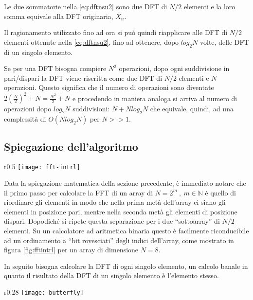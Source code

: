 Le due sommatorie nella \ref{eq:dftnsu2} sono due DFT di ${N/2}$ elementi e la loro somma equivale alla DFT originaria, $X_n$.

Il ragionamento utilizzato fino ad ora si può quindi riapplicare alle DFT di $N/2$ elementi ottenute nella \ref{eq:dftnsu2}, fino ad ottenere, dopo $log_2 N$ volte, delle DFT di un singolo elemento.

Se per una DFT bisogna compiere $N^2$ operazioni, dopo ogni suddivisione in pari/dispari la DFT viene riscritta come due DFT di $N/2$ elementi e $N$ operazioni. Questo significa che il numero di operazioni sono diventate $2(\frac{N}{2})^2 + N = \frac{N^2}{2}+N$ e procedendo in maniera analoga si arriva al numero di operazioni dopo $log_2 N$ suddivisioni: $N + Nlog_2 N$ che equivale, quindi, ad una complessità di $O(Nlog_2 N)$ per $N >> 1$.

\subsection{Spiegazione dell'algoritmo}

\begin{wrapfigure}{r}{0.5\textwidth}
    \centering
    \texttt{[image: fft-intrl]}
    \caption{Scomposizione interlacciata per il calcolo della FFT di un array di 8 elementi.}
    \label{fig:fftintrl}
\end{wrapfigure}

Data la spiegazione matematica della sezione precedente, è immediato notare che il primo passo per calcolare la FFT di un array di $N=2^m\ ,\ m\in\mathbb{N}$ è quello di riordinare gli elementi in modo che nella prima metà dell'array ci siano gli elementi in posizione pari, mentre nella seconda metà gli elementi di posizione dispari. Dopodiché si ripete questa separazione per i due ``sottoarray'' di $N/2$ elementi. Su un calcolatore ad aritmetica binaria questo è facilmente riconducibile ad un ordinamento a ``bit rovesciati'' degli indici dell'array, come mostrato in figura \ref{fig:fftintrl} per un array di dimensione $N=8$.

In seguito bisogna calcolare la DFT di ogni singolo elemento, un calcolo banale in quanto il risultato della DFT di un singolo elemento è l'elemento stesso.

\begin{wrapfigure}{r}{0.28\textwidth}
    \centering
    \texttt{[image: butterfly]}
    \caption{La ``farfalla'', operazione fondamentale per la FFT.}
    \label{fig:fftfarfalla}
\end{wrapfigure}

